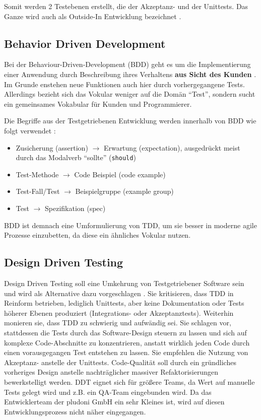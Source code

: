 Somit werden 2 Testebenen erstellt, die der Akzeptanz- und der Unittests. Das Ganze wird auch als Outside-In Entwicklung bezeichnet \citep{chelimsky_rspec_2010}.

\subsection{Behavior Driven Development}
\label{ref:tddBdd}
Bei der Behaviour-Driven-Development (BDD) geht es um die Implementierung einer Anwendung durch Beschreibung ihres Verhaltens \textbf{aus Sicht des Kunden} \citep[S. 138]{chelimsky_rspec_2010}. Im Grunde enstehen neue Funktionen auch hier durch vorhergegangene Tests. Allerdings bezieht sich das Vokular weniger auf die Domän "`Test"', sondern sucht ein gemeinsames Vokabular für Kunden und Programmierer.

Die Begriffe aus der Testgetriebenen Entwicklung werden innerhalb von BDD wie folgt verwendet \citep[S. 151]{chelimsky_rspec_2010}:
\begin{itemize}
 \item Zusicherung (assertion) $\to$ Erwartung (expectation), ausgedrückt meist durch das Modalverb "`sollte"' (\texttt{should})
 \item Test-Methode $\to$ Code Beispiel (code example)
 \item Test-Fall/Test $\to$ Beispielgruppe (example group)
 \item Test $\to$ Spezifikation (spec)
\end{itemize}
BDD ist demnach eine Umformulierung von TDD, um sie besser in moderne agile Prozesse einzubetten, da diese ein ähnliches Vokular nutzen.

\subsection{Design Driven Testing}
Design Driven Testing soll eine Umkehrung von Testgetriebener Software sein und wird als Alternative dazu vorgeschlagen \citep{stephens_design_2010}. Sie kritisieren, dass TDD in Reinform betrieben, lediglich Unittests, aber keine Dokumentation oder Tests höherer Ebenen produziert (Integrations- oder Akzeptanztests). Weiterhin monieren sie, dass TDD zu schwierig und aufwändig sei. Sie schlagen vor, stattdessen die Tests durch das Software-Design steuern zu lassen und sich auf komplexe Code-Abschnitte zu konzentrieren, anstatt wirklich jeden Code durch einen vorausgegangen Test entstehen zu lassen. Sie empfehlen die Nutzung von Akzeptanz- anstelle der Unittests. Code-Qualität soll durch ein gründliches vorheriges Design anstelle nachträglicher massiver Refaktorisierungen bewerkstelligt werden.
DDT eignet sich für größere Teams, da Wert auf manuelle Tests gelegt wird und z.B. ein QA-Team eingebunden wird. Da das Entwicklerteam der pludoni GmbH ein sehr Kleines ist, wird auf diesen Entwicklungsprozess nicht näher eingegangen.
